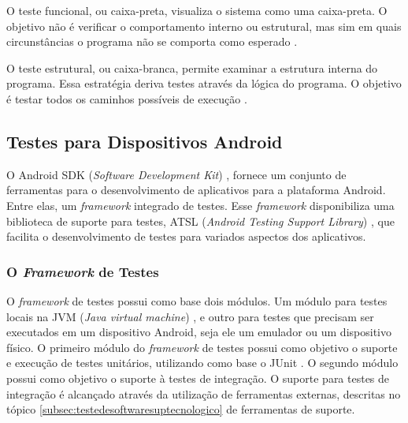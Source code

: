O teste funcional, ou caixa-preta, visualiza o sistema como uma caixa-preta. O
objetivo não é verificar o comportamento interno ou estrutural, mas sim em
quais circunstâncias o programa não se comporta como esperado \cite{myers2011}.

O teste estrutural, ou caixa-branca, permite examinar a estrutura interna do
programa. Essa estratégia deriva testes através da lógica do programa. O
objetivo é testar todos os caminhos possíveis de execução \cite{myers2011}.

  \subsection{Testes para Dispositivos Android}

O Android SDK (\textit{Software Development Kit}) \cite{androidSdk}, fornece um
conjunto de ferramentas para o desenvolvimento de aplicativos para a plataforma
Android. Entre elas, um \textit{framework} integrado de testes. Esse
\textit{framework} disponibiliza uma biblioteca de suporte para testes, ATSL
(\textit{Android Testing Support Library}) \cite{atsl}, que facilita o
desenvolvimento de testes para variados aspectos dos aplicativos.

    \subsubsection{O \textit{Framework} de Testes}

O \textit{framework} de testes possui como base dois módulos. Um módulo para
testes locais na JVM (\textit{Java virtual machine}) \cite{java}, e outro para
testes que precisam ser executados em um dispositivo Android, seja ele um
emulador ou um dispositivo físico.
O primeiro módulo do \textit{framework} de testes possui como objetivo o
suporte e execução de testes unitários, utilizando como base o JUnit
\cite{junit2015}. O segundo módulo possui como objetivo o suporte à testes de
integração. O suporte para testes de integração é alcançado através da
utilização de ferramentas externas, descritas no tópico
\ref{subsec:testedesoftwaresuptecnologico} de ferramentas de suporte.

